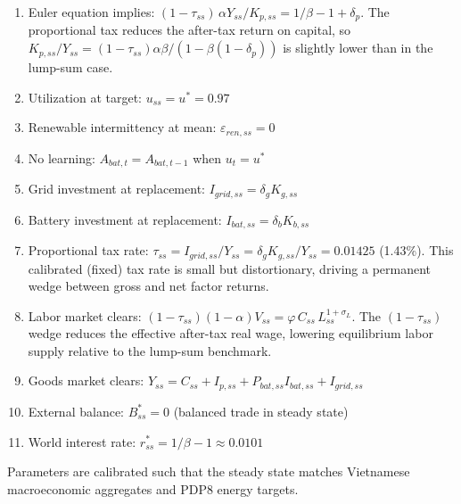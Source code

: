 \begin{enumerate}
	\item Euler equation implies: $(1-\tau_{ss})\,\alpha Y_{ss}/K_{p,ss} = 1/\beta - 1 + \delta_p$. The proportional tax reduces the after-tax return on capital, so $K_{p,ss}/Y_{ss} = (1-\tau_{ss})\alpha\beta/(1-\beta(1-\delta_p))$ is slightly lower than in the lump-sum case.
	\item Utilization at target: $u_{ss} = u^* = 0.97$
	\item Renewable intermittency at mean: $\varepsilon_{ren,ss} = 0$
	\item No learning: $A_{bat,t} = A_{bat,t-1}$ when $u_t = u^*$
	\item Grid investment at replacement: $I_{grid,ss} = \delta_g K_{g,ss}$
	\item Battery investment at replacement: $I_{bat,ss} = \delta_b K_{b,ss}$
	\item Proportional tax rate: $\tau_{ss} = I_{grid,ss}/Y_{ss} = \delta_g K_{g,ss}/Y_{ss} = 0.01425$ (1.43\%). This calibrated (fixed) tax rate is small but distortionary, driving a permanent wedge between gross and net factor returns.
	\item Labor market clears: $(1-\tau_{ss})(1-\alpha)V_{ss} = \varphi \, C_{ss} \, L_{ss}^{1+\sigma_L}$. The $(1-\tau_{ss})$ wedge reduces the effective after-tax real wage, lowering equilibrium labor supply relative to the lump-sum benchmark.
	\item Goods market clears: $Y_{ss} = C_{ss} + I_{p,ss} + P_{bat,ss} I_{bat,ss} + I_{grid,ss}$
	\item External balance: $B^*_{ss} = 0$ (balanced trade in steady state)
	\item World interest rate: $r^*_{ss} = 1/\beta - 1 \approx 0.0101$
\end{enumerate}

Parameters are calibrated such that the steady state matches Vietnamese macroeconomic aggregates and PDP8 energy targets.

